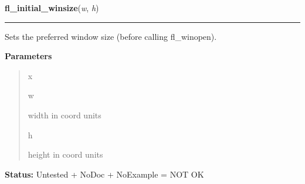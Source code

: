 \hspace{.8\funcindent}\begin{boxedminipage}{\funcwidth}

    \raggedright \textbf{fl\_initial\_winsize}(\textit{w}, \textit{h})

    \vspace{-1.5ex}

    \rule{\textwidth}{0.5\fboxrule}
\setlength{\parskip}{2ex}
    Sets the preferred window size (before calling fl\_winopen).

\setlength{\parskip}{1ex}
      \textbf{Parameters}
      \vspace{-1ex}

      \begin{quote}
        \begin{Ventry}{x}

          \item[w]

          width in coord units

          \item[h]

          height in coord units

        \end{Ventry}

      \end{quote}

\textbf{Status:} Untested + NoDoc + NoExample = NOT OK



    \end{boxedminipage}

    \label{xformslib:library:fl_winsize}

    \vspace{0.5ex}

